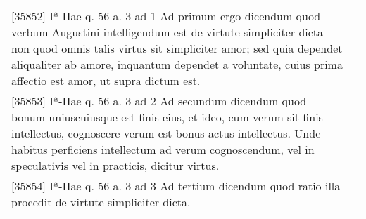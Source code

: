 \documentclass[10pt]{jsarticle}
\begin{document}
\begin{longtable}{p{21em}p{21em}}
\\


[35852] Iª-IIae q. 56 a. 3 ad 1
Ad primum ergo dicendum quod verbum Augustini intelligendum est de
virtute simpliciter dicta non quod omnis talis virtus sit simpliciter
amor; sed quia dependet aliqualiter ab amore, inquantum dependet a
voluntate, cuius prima affectio est amor, ut supra dictum est.


&

\\


[35853] Iª-IIae q. 56 a. 3 ad 2
Ad secundum dicendum quod bonum uniuscuiusque est finis eius, et ideo,
cum verum sit finis intellectus, cognoscere verum est bonus actus
intellectus. Unde habitus perficiens intellectum ad verum
cognoscendum, vel in speculativis vel in practicis, dicitur virtus.


&

\\


[35854] Iª-IIae q. 56 a. 3 ad 3
Ad tertium dicendum quod ratio illa procedit de virtute simpliciter
dicta.


&


\end{longtable}
\newpage
\end{document}

